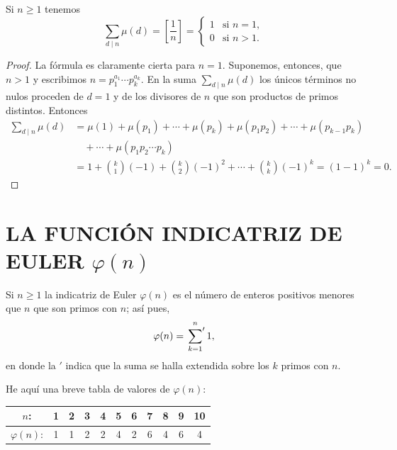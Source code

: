 \documentclass[12pt,a4paper]{book}
\begin{document}
    \begin{teorema}
        Si $n\geq1$ tenemos
        \begin{equation*}
            \sum_{d\mid n}\mu(d)=\left[\frac{1}{n}\right]=
            \begin{cases}
                1 & \text{si } n=1,\\
                0 & \text{si } n>1.
            \end{cases}
        \end{equation*}
    \end{teorema}

    \begin{proof}
        La fórmula es claramente cierta para $n=1$. Suponemos, entonces, que $n>1$ y
        escribimos $n=p_1^{a_1}\cdots p_k^{a_k}$. En la suma $\sum_{d\mid n}\mu(d)$ los
        únicos términos no nulos proceden de $d=1$ y de los divisores de $n$ que son
        productos de primos distintos. Entonces
        \begin{align*}
            \sum_{d\mid n}\mu(d)&=\mu(1)+\mu(p_1)+\cdots+\mu(p_k)+\mu(p_1p_2)+\cdots
            +\mu(p_{k-1}p_k)\\
            &\quad+\cdots+\mu(p_1p_2\cdots p_k)\\
            &=1+\binom{k}{1}(-1)+\binom{k}{2}(-1)^2+\cdots+\binom{k}{k}(-1)^k=(1-1)^k=0.
        \end{align*}
    \end{proof}

    \section{LA FUNCIÓN INDICATRIZ DE EULER \texorpdfstring{$\varphi(n)$}{φ(n)}}

    \begin{definicion}
        Si $n\geq1$ la indicatriz de Euler $\varphi(n)$ es el número de enteros positivos
        menores que $n$ que son primos con $n$; así pues,
        \begin{equation*}
            \varphi(n)=\sideset{}{'}\sum_{k=1}^{n}1,
        \end{equation*}
        en donde la $'$ indica que la suma se halla extendida sobre los $k$ primos con $n$.
    \end{definicion}

    He aquí una breve tabla de valores de $\varphi(n)$:
    \begin{center}
        \begin{tabular}{c|cccccccccc}
            $n$: & 1 & 2 & 3 & 4 & 5 & 6 & 7 & 8 & 9 & 10\\
            \hline
            $\varphi(n)$: & 1 & 1 & 2 & 2 & 4 & 2 & 6 & 4 & 6 & 4
        \end{tabular}
    \end{center}
\end{document}
